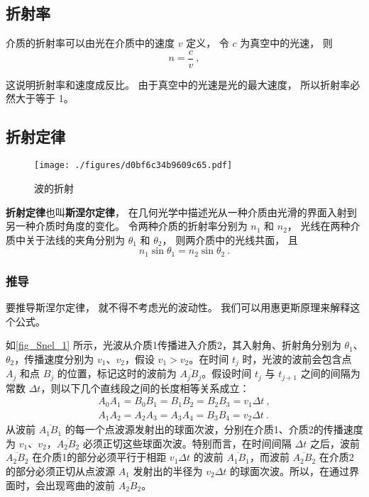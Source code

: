 
\subsection{折射率}
介质的折射率可以由光在介质中的速度 $v$ 定义， 令 $c$ 为真空中的光速， 则
\begin{equation}
n = \frac{c}{v}~,
\end{equation} 

这说明折射率和速度成反比。 由于真空中的光速是光的最大速度， 所以折射率必然大于等于 1。

\subsection{折射定律}
\begin{figure}[ht]
\centering
\texttt{[image: ./figures/d0bf6c34b9609c65.pdf]}
\caption{波的折射} \label{fig_Snel_1}
\end{figure}
\textbf{折射定律}也叫\textbf{斯涅尔定律}， 在几何光学中描述光从一种介质由光滑的界面入射到另一种介质时角度的变化。 令两种介质的折射率分别为 $n_1$ 和 $n_2$， 光线在两种介质中关于法线的夹角分别为 $\theta_1$ 和 $\theta_2$， 则两介质中的光线共面， 且
\begin{equation}
n_1 \sin\theta_1 = n_2 \sin\theta_2~.
\end{equation}


\subsubsection{推导}
要推导斯涅尔定律， 就不得不考虑光的波动性。 我们可以用惠更斯原理来解释这个公式。

如\autoref{fig_Snel_1} 所示，光波从介质1传播进入介质2，其入射角、折射角分别为 $\theta_1$、$\theta_2$，传播速度分别为 $v_1$、$v_2$，假设 $v_1>v_2$。在时间 $t_{j}$ 时，光波的波前会包含点 $A_{j}$ 和点 $B_{j}$ 的位置，标记这时的波前为 $\overline {A_{j}B_{j}}$。假设时间 $t_{j}$ 与 $t_{{j+1}}$ 之间的间隔为常数 $\Delta t$，则以下几个直线段之间的长度相等关系成立：
\begin{equation}
\begin{aligned}
A_{0}A_{1}=B_{0}B_{1}=B_{1}B_{2}=B_{2}B_{3}=v_{1}\Delta t ~,\\
A_{1}A_{2}=A_{2}A_{3}=A_{3}A_{4}=B_{3}B_{4}=v_{2}\Delta t~.
\end{aligned}
\end{equation}
从波前 $\overline {A_{1}B_{1}}$ 的每一个点波源发射出的球面次波，分别在介质1、介质2的传播速度为 $v_1$、$v_2$，$\overline {A_{2}B_{2}}$ 必须正切这些球面次波。特别而言，在时间间隔 $\Delta t$ 之后，波前 $\overline {A_{2}B_{2}}$ 在介质1的部分必须平行于相距 $v_{1}\Delta t$ 的波前 $\overline {A_{1}B_{1}}$，而波前 $\overline {A_{2}B_{2}}$ 在介质2的部分必须正切从点波源 $A_{1}$ 发射出的半径为 $v_{2}\Delta t$ 的球面次波。所以，在通过界面时，会出现弯曲的波前 $\overline {A_{2}B_{2}}$。

